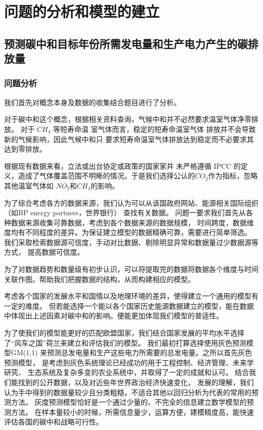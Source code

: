 \documentclass[bwprint]{gmcmthesis}
\numberwithin{figure}{section}
\newcommand{\upcite}[1]{\textsuperscript{\textsuperscript{\cite{#1}}}}
\begin{document}
\section{问题的分析和模型的建立}
\subsection{预测碳中和目标年份所需发电量和生产电力产生的碳排放量}
\subsubsection{问题分析}
我们首先对概念本身及数据的收集结合题目进行了分析。

对于碳中和这个概念，根据相关资料查询，气候中和并不必然要求温室气体净零排放。
对于 $CH_4$ 等短寿命温
室气体而言，稳定的短寿命温室气体
排放并不会导致新的气候影响，因此气候中和只
要求短寿命温室气体排放达到稳定而不必要求其
达到零排放。\upcite{meaning}

根据现有数据来看，立法或出台协定或政策的国家家并
未严格遵循 IPCC 的定义，造成了气体覆盖范围不明晰的情况。于是我们选择公认的$CO_{2}$作为指标，忽略其他温室气体如
$NO_{2}\text{和}CH_{4}$的影响。\upcite{meaning}

为了综合考虑各方的数据来源，我们认为可以从该国政府网站、能源相关国际组织（如BP energy partners，世界银行） 查找有关数据。
问题一要求我们首先从各种数据来源收集可靠数据，考虑到各个数据来源的数据规模，
时间跨度，数据维度均有不同程度的差异。为保证建立模型的数据精确可靠，需要进行简单筛选。
我们采取检索数据源可信度，手动对比数据、剔除明显异常和数据量过少数据源等方式，
提高数据可信度。

为了对数据趋势和数量级有初步认识，可以将提取完的数据将数据各个维度与时间关联作图。帮助我们把握数据的结构，从而构建相应的模型。

考虑各个国家的发展水平和国情以及地理环境的差异，使得建立一个通用的模型有一定的难度。
但若能选择一个能以各个国家历史能源数据建立的模型，能在数据中体现出上述因素对碳中和的影响。便能更加体现我们模型的普适性。

为了使我们的模型能更好的匹配欧盟国家，我们结合国家发展的平均水平选择了“风车之国”荷兰来建立和评估我们的模型。
我们最初打算选择使用灰色预测模型GM(1,1)
来预测总发电量和生产这些电力所需要的总发电量。之所以首先灰色预测模型，
是考虑到灰色系统理论已经成功的用于工程控制、经济管理、未来学研究、
生态系统及复杂多变的农业系统中，并取得了一定的成就和认可。
结合我们能找到的公开数据，以及对近些年世界政治经济快速变化，
发展的理解，我们认为手中得到的数据量较少且分类粗糙，不适合其他以回归分析为代表的常用的预测方法。
灰度预测模型恰好是一个通过少量的、不完全的信息建立数学模型的预测方法。
在样本量较小的时候，所需信息量少，运算方便，建模精度高，能快速评估各国的碳中和战略可行性。
\end{document}
